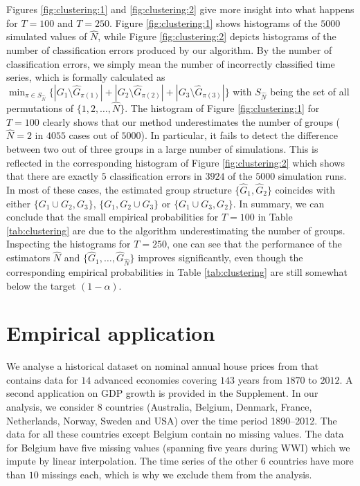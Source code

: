 \documentclass[12pt]{article}
\begin{document}
Figures \ref{fig:clustering:1} and \ref{fig:clustering:2} give more insight into what happens for $T=100$ and $T=250$. Figure \ref{fig:clustering:1} shows histograms of the $5000$ simulated values of $\widehat{N}$, while Figure \ref{fig:clustering:2} depicts histograms of the number of classification errors produced by our algorithm. By the number of classification errors, we simply mean the number of incorrectly classified time series, which is formally calculated as 
$\min_{\pi \in S_{\hat{N}}} \big\{ |G_1 \setminus \widehat{G}_{\pi(1)}| +|G_2 \setminus \widehat{G}_{\pi(2)}| + |G_3 \setminus \widehat{G}_{\pi(3)}| \big\}$
with $S_{\widehat{N}}$ being the set of all permutations of $\{1, 2, \ldots, \widehat{N}\}$. The histogram of Figure \ref{fig:clustering:1} for $T=100$ clearly shows that our method underestimates the number of groups ($\widehat{N} = 2$ in $4055$ cases out of $5000$). In particular, it fails to detect the difference between two out of three groups in a large number of simulations. This is reflected in the corresponding histogram of Figure \ref{fig:clustering:2} which shows that there are exactly $5$ classification errors in $3924$ of the $5000$ simulation runs. In most of these cases, the estimated group structure $\{ \widehat{G}_1, \widehat{G}_{2}\}$ coincides with either $\{ G_1 \cup G_2,G_3\}$,  $\{ G_1, G_2\cup G_3\}$ or $ \{ G_1 \cup G_3,G_2\}$. In summary, we can conclude that the small empirical probabilities for $T=100$ in Table \ref{tab:clustering} are due to the algorithm underestimating the number of groups. Inspecting the histograms for $T=250$, one can see that the performance of the estimators $\widehat{N}$ and $\{ \widehat{G}_1,\ldots, \widehat{G}_{\widehat{N}} \}$ improves significantly, even though the corresponding empirical probabilities in Table \ref{tab:clustering} are still somewhat below the target $(1-\alpha)$.  



\section{Empirical application}\label{sec:app}


We analyse a historical dataset on nominal annual house prices from \cite{Knoll2017} that contains data for $14$ advanced economies covering $143$ years from $1870$ to $2012$. 
A second application on GDP growth is provided in the Supplement. 
In our analysis, we consider 8 countries (Australia, Belgium, Denmark, France, Netherlands, Norway, Sweden and USA) over the time period 1890--2012. The data for all these countries except Belgium contain no missing values. The data for Belgium have five missing values (spanning five years during WWI) 
which we impute by linear interpolation. The time series of the other $6$ countries have more than $10$ missings each, which is why we exclude them from the analysis.
\end{document}
